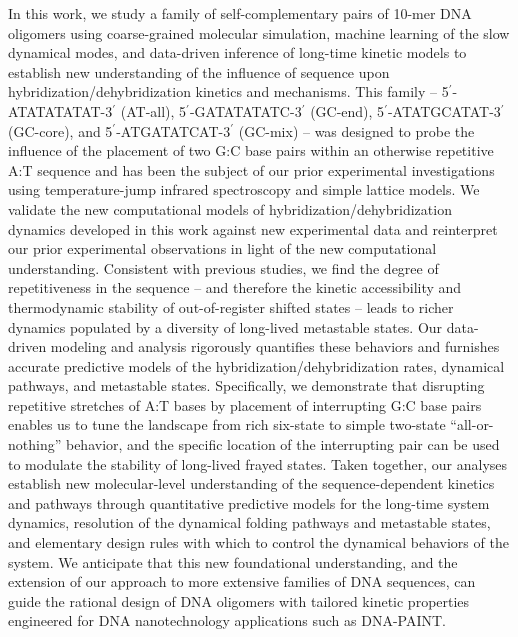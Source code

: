 \documentclass[journal=jpcbfk,manuscript=article]{achemso}
\begin{document}
In this work, we study a family of self-complementary pairs of 10-mer DNA oligomers using coarse-grained molecular simulation, machine learning of the slow dynamical modes, and data-driven inference of long-time kinetic models to establish new understanding of the influence of sequence upon hybridization/dehybridization kinetics and mechanisms. This family -- 5$^\prime$-ATATATATAT-3$^\prime$ (AT-all), 5$^\prime$-GATATATATC-3$^\prime$ (GC-end), 5$^\prime$-ATATGCATAT-3$^\prime$ (GC-core), and 5$^\prime$-ATGATATCAT-3$^\prime$ (GC-mix) -- was designed to probe the influence of the placement of two G:C base pairs within an otherwise repetitive A:T sequence and has been the subject of our prior experimental investigations using temperature-jump infrared spectroscopy and simple lattice models. \citep{Sanstead2016} We validate the new computational models of hybridization/dehybridization dynamics developed in this work against new experimental data and reinterpret our prior experimental observations in light of the new computational understanding. Consistent with previous studies, \citep{Hinckley2014Coarse-grainedEffects,Romano2013DNADependence,Araque2016LatticeCooperativity} we find the degree of repetitiveness in the sequence -- and therefore the kinetic accessibility and thermodynamic stability of out-of-register shifted states -- leads to richer dynamics populated by a diversity of long-lived metastable states. Our data-driven modeling and analysis rigorously quantifies these behaviors and furnishes accurate predictive models of the hybridization/dehybridization rates, dynamical pathways, and metastable states. Specifically, we demonstrate that disrupting repetitive stretches of A:T bases by placement of interrupting G:C base pairs enables us to tune the landscape from rich six-state to simple two-state ``all-or-nothing'' behavior, and the specific location of the interrupting pair can be used to modulate the stability of long-lived frayed states. Taken together, our analyses establish new molecular-level understanding of the sequence-dependent kinetics and pathways through quantitative predictive models for the long-time system dynamics, resolution of the dynamical folding pathways and metastable states, and elementary design rules with which to control the dynamical behaviors of the system. We anticipate that this new foundational understanding, and the extension of our approach to more extensive families of DNA sequences, can guide the rational design of DNA oligomers with tailored kinetic properties engineered for DNA nanotechnology applications such as DNA-PAINT. \citep{Shah2019, Strauss2020UpDNA-PAINT}
\end{document}

